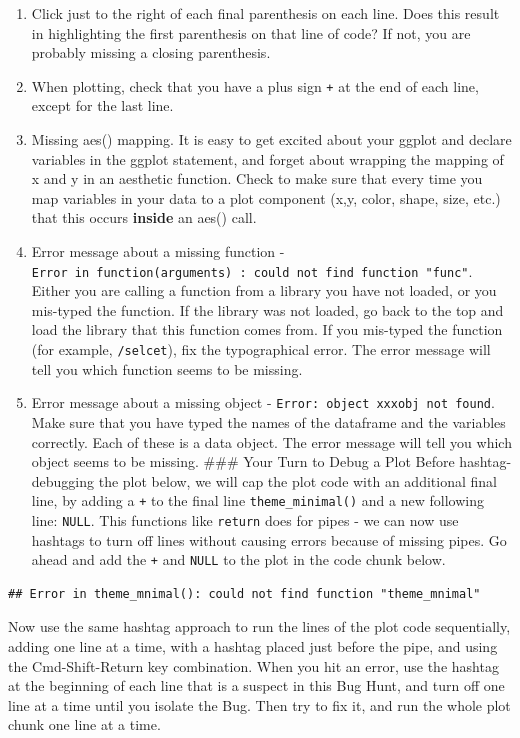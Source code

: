 \documentclass[
]{book}
\providecommand{\tightlist}{%
  \setlength{\itemsep}{0pt}\setlength{\parskip}{0pt}}
\begin{document}
\begin{enumerate}
\def\labelenumi{\arabic{enumi}.}
\tightlist
\item
  Click just to the right of each final parenthesis on each line. Does this result in highlighting the first parenthesis on that line of code? If not, you are probably missing a closing parenthesis.
\item
  When plotting, check that you have a plus sign \texttt{+} at the end of each line, except for the last line.
\item
  Missing aes() mapping.
  It is easy to get excited about your ggplot and declare variables in the ggplot statement, and forget about wrapping the mapping of x and y in an aesthetic function. Check to make sure that every time you map variables in your data to a plot component (x,y, color, shape, size, etc.) that this occurs \textbf{inside} an aes() call.
\item
  Error message about a missing function - \texttt{Error\ in\ function(arguments)\ :\ could\ not\ find\ function\ "func"}. Either you are calling a function from a library you have not loaded, or you mis-typed the function. If the library was not loaded, go back to the top and load the library that this function comes from. If you mis-typed the function (for example, \texttt{/selcet}), fix the typographical error. The error message will tell you which function seems to be missing.
\item
  Error message about a missing object - \texttt{Error:\ object\ \textquotesingle{}xxxobj\textquotesingle{}\ not\ found}. Make sure that you have typed the names of the dataframe and the variables correctly. Each of these is a data object. The error message will tell you which object seems to be missing.
  \#\#\# Your Turn to Debug a Plot
  Before hashtag-debugging the plot below, we will cap the plot code with an additional final line, by adding a \texttt{+} to the final line \texttt{theme\_minimal()} and a new following line: \texttt{NULL}. This functions like \texttt{return} does for pipes - we can now use hashtags to turn off lines without causing errors because of missing pipes.
  Go ahead and add the \texttt{+} and \texttt{NULL} to the plot in the code chunk below.
\end{enumerate}

\begin{verbatim}
## Error in theme_mnimal(): could not find function "theme_mnimal"
\end{verbatim}

Now use the same hashtag approach to run the lines of the plot code sequentially, adding one line at a time, with a hashtag placed just before the pipe, and using the Cmd-Shift-Return key combination. When you hit an error, use the hashtag at the beginning of each line that is a suspect in this Bug Hunt, and turn off one line at a time until you isolate the Bug.
Then try to fix it, and run the whole plot chunk one line at a time.
\end{document}
